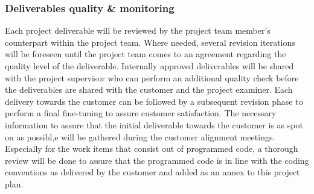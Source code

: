 \subsubsection{Deliverables quality \& monitoring}
Each project deliverable will be reviewed by the project team member’s counterpart within the project team.
Where needed, several revision iterations will be foreseen until the project team comes to an agreement regarding the quality level of the deliverable.
Internally approved deliverables will be shared with the project supervisor who can perform an additional quality check before the deliverables are shared with the customer and the project examiner.
Each delivery towards the customer can be followed by a subsequent revision phase to perform a final fine-tuning to assure customer satisfaction.
The necessary information to assure that the initial deliverable towards the customer is as spot on as possibl,e will be gathered during the customer alignment meetings. 
Especially for the work items that consist out of programmed code, a thorough review will be done to assure that the programmed code is in line with the coding conventions as delivered by the customer and added as an annex to this project plan.




